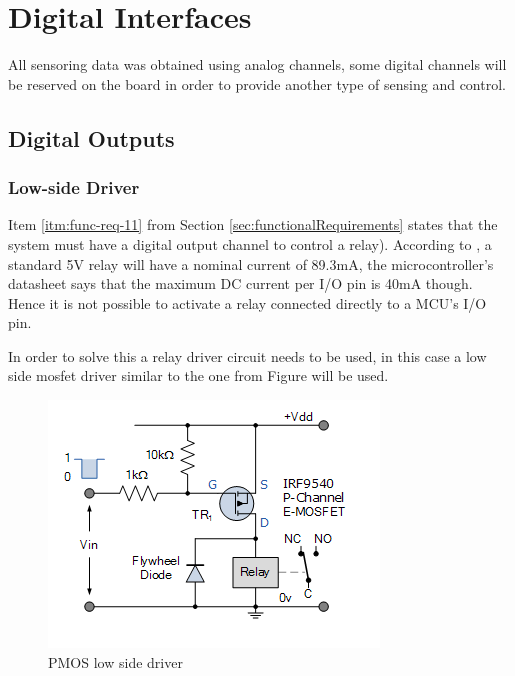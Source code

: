 \section{Digital Interfaces}\label{sec:digital-interfaces}

	All sensoring data was obtained using analog channels, some digital channels will be reserved on the board in order to provide another type of sensing and control.

	\subsection{Digital Outputs}\label{ssec:digital-outputs}

		\subsubsection{Low-side Driver}\label{sssec:digital-outputs-low-side-driver}

			Item \ref{itm:func-req-11} from Section \ref{sec:functionalRequirements} states that the system must have a digital output channel to control a relay). According to \cite{songle-relay-datasheet}, a standard 5V relay will have a nominal current of 89.3mA, the microcontroller's datasheet \cite{atmega32u4-datasheet} says that the maximum DC current per I/O pin is 40mA though. Hence it is not possible to activate a relay connected directly to a MCU's I/O pin.
			\par 
			In order to solve this a relay driver circuit needs to be used, in this case a low side mosfet driver similar to the one from Figure \cite{pmos-low-side-driver} will be used.

			\begin{figure}[htbp]
				\centering
				\includegraphics[scale=1]{figuras/fig-pmos-low-side-driver.png}
				\caption{PMOS low side driver \cite{pmos-low-side-driver}}
				\label{fig:pmos-low-side-driver}
			\end{figure}

